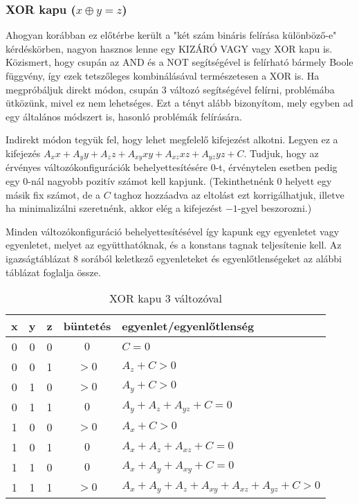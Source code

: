 \subsubsection{XOR kapu ($x \oplus y = z$)} \label{sec:XORgate}

Ahogyan korábban ez előtérbe került a "két szám bináris felírása különböző-e" kérdéskörben, nagyon hasznos lenne egy KIZÁRÓ VAGY vagy XOR kapu is. Közismert, hogy csupán az AND és a NOT segítségével is felírható bármely Boole függvény, így ezek tetszőleges kombinálásával természetesen a XOR is.
Ha megpróbáljuk direkt módon, csupán 3 változó segítségével felírni, problémába ütközünk, mivel ez nem lehetséges. Ezt a tényt alább bizonyítom, mely egyben ad egy általános módszert is, hasonló problémák felírására.

Indirekt módon tegyük fel, hogy lehet megfelelő kifejezést alkotni. Legyen ez a kifejezés $A_xx+A_yy+A_zz+A_{xy}xy+A_{xz}xz+A_{yz}yz+C$. Tudjuk, hogy az érvényes változókonfigurációk behelyettesítésére $0$-t, érvénytelen esetben pedig egy $0$-nál nagyobb pozitív számot kell kapjunk. 
(Tekinthetnénk $0$ helyett egy másik fix számot, de a $C$ taghoz hozzáadva az eltolást ezt korrigálhatjuk, illetve ha minimalizálni szeretnénk, akkor elég a kifejezést $-1$-gyel beszorozni.)

Minden változókonfiguráció behelyettesítésével így kapunk egy egyenletet vagy egyenletet, melyet az együtthatóknak, és a konstans tagnak teljesítenie kell. Az igazságtáblázat 8 sorából keletkező egyenleteket és egyenlőtlenségeket az alábbi táblázat foglalja össze.

\begin{table}[ht]
	\footnotesize
	\centering
	\begin{tabular}{ c c c c l }
		\toprule
		x & y & z & büntetés & egyenlet/egyenlőtlenség \\
		\midrule
		0 & 0 & 0 & $0 $ & $C=0$   \\
		0 & 0 & 1 & $>0$ & $A_{z}+C>0$ \\
		0 & 1 & 0 & $>0$ & $A_{y}+C>0$ \\
		0 & 1 & 1 & $0 $ & $A_{y}+A_{z}+A_{yz}+C=0$   \\
		1 & 0 & 0 & $>0$ & $A_{x}+C>0$ \\
		1 & 0 & 1 & $0 $ & $A_{x}+A_{z}+A_{xz}+C=0$   \\
		1 & 1 & 0 & $0 $ & $A_{x}+A_{y}+A_{xy}+C=0$   \\
		1 & 1 & 1 & $>0$ & $A_{x}+A_{y}+A_{z}+A_{xy}+A_{xz}+A_{yz}+C>0$ \\				
		\bottomrule
	\end{tabular}
	\caption{XOR kapu 3 változóval}
	\label{tab:XORgate3var}
\end{table}

